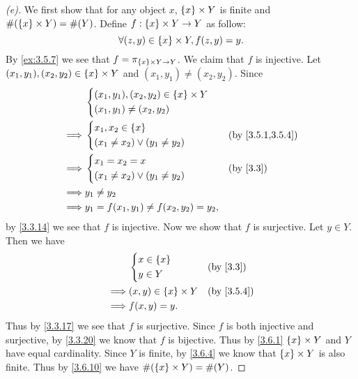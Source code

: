 \begin{proof}[(e)]
	We first show that for any object \(x\), \(\left\lbrace x\right\rbrace \times Y\) is finite and \(\#(\left\lbrace x\right\rbrace \times Y) = \#(Y)\).
	Define \(f : \left\lbrace x\right\rbrace \times Y \to Y\) as follow:
	\[
		\forall (z, y) \in \left\lbrace x\right\rbrace \times Y, f(z, y) = y.
	\]
	By \cref{ex:3.5.7} we see that \(f = \pi_{\left\lbrace x\right\rbrace \times Y \to Y}\).
	We claim that \(f\) is injective.
	Let \((x_1, y_1), (x_2, y_2) \in \left\lbrace x\right\rbrace \times Y\) and \((x_1, y_1) \neq (x_2, y_2)\).
	Since
	\begin{align*}
		         & \begin{dcases}
			           (x_1, y_1), (x_2, y_2) \in \set{x} \times Y \\
			           (x_1, y_1) \neq (x_2, y_2)
		           \end{dcases}    \\
		\implies & \begin{dcases}
			           x_1, x_2 \in \set{x} \\
			           (x_1 \neq x_2) \lor (y_1 \neq y_2)
		           \end{dcases}             &  & \by{3.5.1,3.5.4} \\
		\implies & \begin{dcases}
			           x_1 = x_2 = x \\
			           (x_1 \neq x_2) \lor (y_1 \neq y_2)
		           \end{dcases}             &  & \by{3.3}         \\
		\implies & y_1 \neq y_2                                   \\
		\implies & y_1 = f(x_1, y_1) \neq f(x_2, y_2) = y_2,
	\end{align*}
	by \cref{3.3.14} we see that \(f\) is injective.
	Now we show that \(f\) is surjective.
	Let \(y \in Y\).
	Then we have
	\begin{align*}
		         & \begin{dcases}
			           x \in \set{x} \\
			           y \in Y
		           \end{dcases}            &  & \by{3.3}       \\
		\implies & (x, y) \in \set{x} \times Y &  & \by{3.5.4} \\
		\implies & f(x, y) = y.
	\end{align*}
	Thus by \cref{3.3.17} we see that \(f\) is surjective.
	Since \(f\) is both injective and surjective, by \cref{3.3.20} we know that \(f\) is bijective.
	Thus by \cref{3.6.1} \(\left\lbrace x\right\rbrace \times Y\) and \(Y\) have equal cardinality.
	Since \(Y\) is finite, by \cref{3.6.4} we know that \(\left\lbrace x\right\rbrace \times Y\) is also finite.
	Thus by \cref{3.6.10} we have \(\#(\left\lbrace x\right\rbrace \times Y) = \#(Y)\).


\end{proof}

